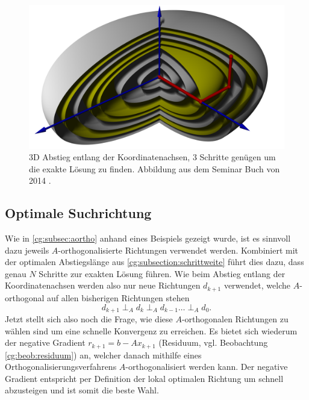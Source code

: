 \begin{figure}	
	\centering
	\includegraphics[width=0.8\hsize]{papers/cg/images/descent3d.jpg}
	\caption{3D Abstieg entlang der Koordinatenachsen, 3 Schritte genügen um die exakte Lösung zu finden. 
		Abbildung aus dem Seminar Buch von 2014 \cite{cg:book:hpc}.}
	\label{cg:abb:koordabstieg2}
\end{figure}

\subsection{Optimale Suchrichtung \label{cg:subsection:suchrichtung}}

Wie in \ref{cg:subsec:aortho} anhand eines Beispiels gezeigt wurde, ist es sinnvoll dazu jeweils $A$-orthogonalisierte Richtungen verwendet werden.
Kombiniert mit der optimalen Abstiegslänge aus \ref{cg:subsection:schrittweite} führt dies dazu, dass genau $N$ Schritte zur exakten Lösung führen.
Wie beim Abstieg entlang der Koordinatenachsen werden also nur neue Richtungen $d_{k+1}$ verwendet, welche $A$-orthogonal auf allen bisherigen Richtungen stehen
\begin{equation}
	d_{k+1}  \perp_A  d_k  \perp_A  d_{k-1}  \dots \perp_A  d_0.
\end{equation}
Jetzt stellt sich also noch die Frage, wie diese $A$-orthogonalen Richtungen zu wählen sind um eine schnelle Konvergenz zu erreichen.
Es bietet sich wiederum der negative Gradient $r_{k+1} = b - Ax_{k+1}$ (Residuum, vgl. Beobachtung \ref{cg:beob:residuum}) an, welcher danach mithilfe eines Orthogonalisierungsverfahrens $A$-orthogonalisiert werden kann.
Der negative Gradient entspricht per Definition der lokal optimalen Richtung um schnell abzusteigen und ist somit die beste Wahl.

